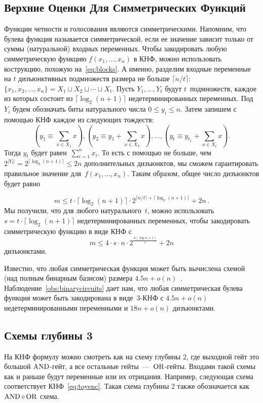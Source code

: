 \subsection{Верхние Оценки Для Симметрических Функций}\label{upperbound}
Функции четности и голосования являются симметрическими. Напомним, что
булева функция называется симметрической, если ее значение зависит только от суммы (натуральной) входных переменных.
Чтобы закодировать любую симметрическую функцию $f(x_1, \dotsc, x_n)$ в КНФ, можно использовать кострукцию, похожую на~\eqref{eq:blocks}. 
А именно, разделим входные переменные на $t$  дизъюнктивных подмножеств размера не больше $\lceil n/t \rceil$:
$\{x_1, x_2, \dotsc, x_n\}=X_1 \sqcup X_2 \sqcup \dotsb \sqcup X_{t}$.
Пусть $Y_1, \dotsc, Y_t$ будут $t$~подмножеств, каждое из которых состоит из $\lceil \log_2 (n+1) \rceil$ недетерминированных переменных.
Под $Y_i$ будем обозначать биты натурального числа $0 \le y_i \le n$.
Затем запишем с помощью КНФ каждое из следующих тождеств:
\[
\left(y_1 \equiv \sum_{x \in X_1}x\right),
\left(y_2 \equiv y_1+\sum_{x \in X_2}x\right), 
\dotsc,
\left(y_t \equiv y_{t_1}+\sum_{x \in X_t}x\right).
\]
Тогда $y_t$ будет равен~$\sum_{i=1}^nx_i$. То есть с помощью не больше, чем  
$2^{|Y_t|}=2^{\lceil \log_2 (n+1) \rceil} \le 2n$ дополнительных дизъюнктов, мы сможем гарантировать правильное значение для~$f(x_1, \dotsc, x_n)$.
Таким образом, общее число дизъюнктов будет равно

	\[m \le t \cdot \lceil \log_2 (n+1) \rceil \cdot 2^{\lceil n/t\rceil+ \lceil \log_2 (n+1) \rceil} + 2n \, .\]
Мы получили, что для любого натурального~$t$, можно использовать $s=t \cdot \lceil \log_2 (n+1) \rceil$ недетерминированных переменных, чтобы закодировать симметрическую функцию в виде КНФ с
	\[m \le 4 \cdot s \cdot n \cdot 2^{\frac{n (\log n + 1)}{s}} + 2n\]
дизъюнктами.

Известно, что любая симметрическая функция может быть вычислена схемой (над полным бинарным базисом)
размера $4.5n+o(n)$~\cite{DBLP:journals/ipl/DemenkovKKY10}.
Наблюдение~\ref{obs:binarycircuits} дает нам, что любая симметрическая булева функция может быть закодирована в виде~$3$-КНФ 
с $4.5n+o(n)$ недетерминированными переменными и 
$18n+o(n)$ дизъюнктами.

\subsection{Схемы глубины 3}

На КНФ формулу можно смотреть как на схему глубины $2$, где выходной гейт это большой $\operatorname{AND}$-гейт, а все остальные гейты~---~$\operatorname{OR}$-гейты. Входами такой схемы как и раньше будут переменные или их отрицания. Например, следующая  схема соответствует КНФ~\eqref{eq:toyenc}. Такая схема  глубины $2$ также обозначается как  $\operatorname{AND} \circ \operatorname{OR}$ схема.


